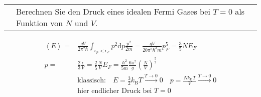 \documentclass[a4paper,12pt]{scrartcl}
\makeatletter
\def\ka#1{\left(#1\right)}				%
\def\kb#1{\left\langle #1\right\rangle}			%
\def\d{\mathrm{d}}					%
\def\kB{k_\mathrm{B}}					%
\newcounter{qc}\setcounter{qc}{1}
\newenvironment{fshaded}{
\def\FrameCommand{\fcolorbox{framecolor}{shadecolor}}
\MakeFramed {\FrameRestore}}
{\endMakeFramed}
\def\frage#1{
\begin{fshaded}
\noindent
\begin{tabularx}{0.99\textwidth}{@{}c!{\color{framecolor}\vline}X}
{ \bf \rm \theqc }	&	\noindent #1
\end{tabularx}
\stepcounter{qc}
\end{fshaded}
}
\makeatother
\begin{document}

\frage{Berechnen Sie den Druck eines idealen Fermi Gases bei $T=0$ als Funktion von $N$ und $V$.}
\noindent
\begin{align*}
	\kb E=&\frac{gV}{2\pi^2\hbar}\int_{\epsilon_p<\epsilon_F}p^2\d 
p\frac{p^2}{2m}=\frac{gV}{20\pi^2\hbar^3m}p_F^5=\frac35NE_F\\
	p=&\frac23\frac\epsilon V=\frac25\frac NVE_F=\frac{\hbar^2}{5m}\frac{6\pi^2}{g}\ka{\frac NV}^{\frac52}\\
	&\text{klassisch:}\quad E=\frac32\kB T\stackrel{T\rightarrow0}{\longrightarrow}0\quad 
p=\frac{N\kB T}V\stackrel{T\rightarrow0}{\longrightarrow}0\\
	&\text{hier endlicher Druck bei $T=0$}
\end{align*}
\end{document}
